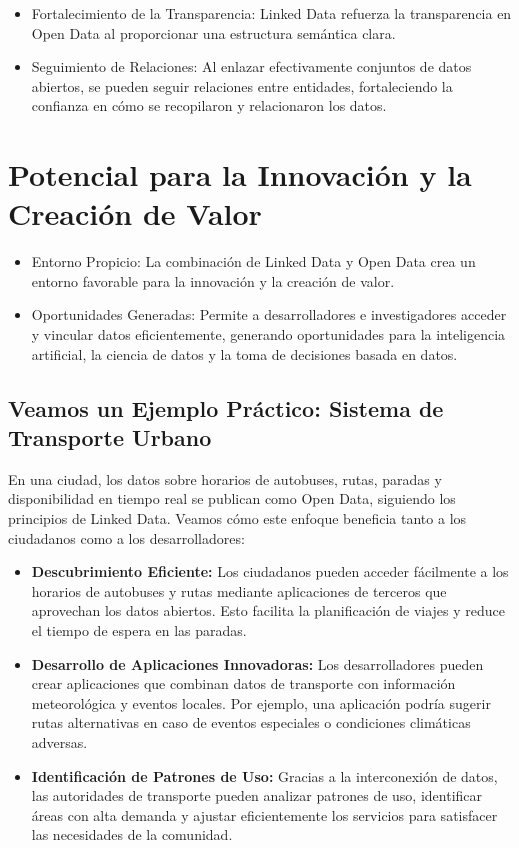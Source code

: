 \documentclass[11pt]{report}
\begin{document}

\begin{itemize}
  \item Fortalecimiento de la Transparencia: Linked Data refuerza la transparencia en Open Data al proporcionar una estructura semántica clara.
  \item Seguimiento de Relaciones: Al enlazar efectivamente conjuntos de datos abiertos, se pueden seguir relaciones entre entidades, fortaleciendo la confianza en cómo se recopilaron y relacionaron los datos.
\end{itemize}

\section{Potencial para la Innovación y la Creación de Valor}

\begin{itemize}
  \item Entorno Propicio: La combinación de Linked Data y Open Data crea un entorno favorable para la innovación y la creación de valor.
  \item Oportunidades Generadas: Permite a desarrolladores e investigadores acceder y vincular datos eficientemente, generando oportunidades para la inteligencia artificial, la ciencia de datos y la toma de decisiones basada en datos.
\end{itemize}

\subsection{Veamos un Ejemplo Práctico: Sistema de Transporte Urbano}

En una ciudad, los datos sobre horarios de autobuses, rutas, paradas y disponibilidad en tiempo real se publican como Open Data, siguiendo los principios de Linked Data. Veamos cómo este enfoque beneficia tanto a los ciudadanos como a los desarrolladores:

\begin{itemize}
    \item \textbf{Descubrimiento Eficiente:} Los ciudadanos pueden acceder fácilmente a los horarios de autobuses y rutas mediante aplicaciones de terceros que aprovechan los datos abiertos. Esto facilita la planificación de viajes y reduce el tiempo de espera en las paradas.
    
    \item \textbf{Desarrollo de Aplicaciones Innovadoras:} Los desarrolladores pueden crear aplicaciones que combinan datos de transporte con información meteorológica y eventos locales. Por ejemplo, una aplicación podría sugerir rutas alternativas en caso de eventos especiales o condiciones climáticas adversas.
    
    \item \textbf{Identificación de Patrones de Uso:} Gracias a la interconexión de datos, las autoridades de transporte pueden analizar patrones de uso, identificar áreas con alta demanda y ajustar eficientemente los servicios para satisfacer las necesidades de la comunidad.
\end{itemize}
\end{document}
